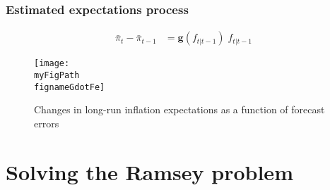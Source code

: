 \documentclass[10pt]{beamer}
\def \myFigPath {../../../figures/}
\DeclareMathOperator{\E}{\mathbb{E}}
\def\meanalph{(0.82;    0.61;    0;    0.33;    0.45)}
\def\fignameGdotFe{gdot_feN_100_nfe_5_gridspacing_manual_Wdiffs2_100000_Wmid_1000_Nsimulations_command_sigmas_13_Nov_2020_13_50_48}
\begin{document}
%
%
%
%

\begin{frame}
	\frametitle{Estimated expectations process}

\begin{align}
\bar{\pi}_{t}  - \bar{\pi}_{t-1} &=\mathbf{g}(f_{t|t-1}) \; f_{t|t-1} \tag{18}
\end{align}


\begin{figure}[h!]
\texttt{[image: \\myFigPath \\fignameGdotFe]}
\caption{Changes in long-run inflation expectations as a function of forecast errors}
\label{epi}
\end{figure}


\end{frame}






\section{Solving the Ramsey problem}
\end{document}
